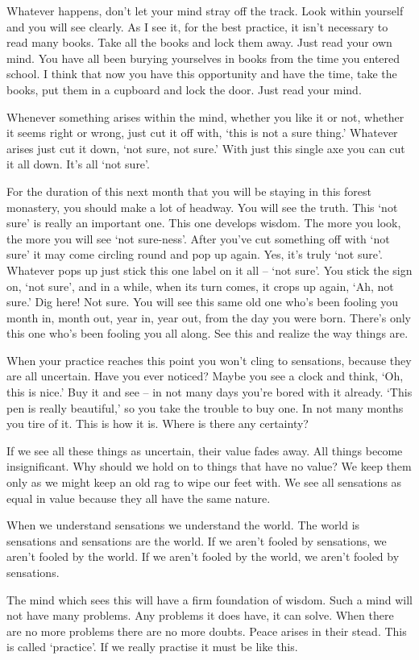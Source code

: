 Whatever happens, don't let your mind stray off the track. Look within yourself and you will see clearly. As I see it, for the best practice, it isn't necessary to read many books. Take all the books and lock them away. Just read your own mind. You have all been burying yourselves in books from the time you entered school. I think that now you have this opportunity and have the time, take the books, put them in a cupboard and lock the door. Just read your mind. 

Whenever something arises within the mind, whether you like it or not, whether it seems right or wrong, just cut it off with, `this is not a sure thing.' Whatever arises just cut it down, `not sure, not sure.' With just this single axe you can cut it all down. It's all `not sure'. 

For the duration of this next month that you will be staying in this forest monastery, you should make a lot of headway. You will see the truth. This `not sure' is really an important one. This one develops wisdom. The more you look, the more you will see `not sure-ness'. After you've cut something off with `not sure' it may come circling round and pop up again. Yes, it's truly `not sure'. Whatever pops up just stick this one label on it all -- `not sure'. You stick the sign on, `not sure', and in a while, when its turn comes, it crops up again, `Ah, not sure.' Dig here! Not sure. You will see this same old one who's been fooling you month in, month out, year in, year out, from the day you were born. There's only this one who's been fooling you all along. See this and realize the way things are. 

When your practice reaches this point you won't cling to sensations, because they are all uncertain. Have you ever noticed? Maybe you see a clock and think, `Oh, this is nice.' Buy it and see -- in not many days you're bored with it already. `This pen is really beautiful,' so you take the trouble to buy one. In not many months you tire of it. This is how it is. Where is there any certainty? 

If we see all these things as uncertain, their value fades away. All things become insignificant. Why should we hold on to things that have no value? We keep them only as we might keep an old rag to wipe our feet with. We see all sensations as equal in value because they all have the same nature. 

When we understand sensations we understand the world. The world is sensations and sensations are the world. If we aren't fooled by sensations, we aren't fooled by the world. If we aren't fooled by the world, we aren't fooled by sensations. 

The mind which sees this will have a firm foundation of wisdom. Such a mind will not have many problems. Any problems it does have, it can solve. When there are no more problems there are no more doubts. Peace arises in their stead. This is called `practice'. If we really practise it must be like this. 

